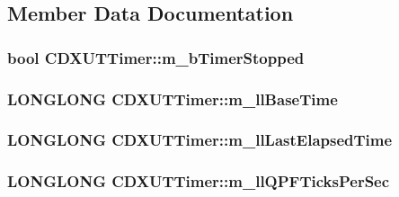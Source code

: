 \subsection{Member Data Documentation}
\hypertarget{class_c_d_x_u_t_timer_ab6969b767724f796674c46618a9cef34}{
\subsubsection[{m\_\-bTimerStopped}]{\setlength{\rightskip}{0pt plus 5cm}bool {\bf CDXUTTimer::m\_\-bTimerStopped}}}
\label{class_c_d_x_u_t_timer_ab6969b767724f796674c46618a9cef34}
\hypertarget{class_c_d_x_u_t_timer_ab756323e5a37b91a5eab6275a27a734a}{
\subsubsection[{m\_\-llBaseTime}]{\setlength{\rightskip}{0pt plus 5cm}LONGLONG {\bf CDXUTTimer::m\_\-llBaseTime}}}
\label{class_c_d_x_u_t_timer_ab756323e5a37b91a5eab6275a27a734a}
\hypertarget{class_c_d_x_u_t_timer_a9dc6f56a2fddb4c275d33ca8858f2367}{
\subsubsection[{m\_\-llLastElapsedTime}]{\setlength{\rightskip}{0pt plus 5cm}LONGLONG {\bf CDXUTTimer::m\_\-llLastElapsedTime}}}
\label{class_c_d_x_u_t_timer_a9dc6f56a2fddb4c275d33ca8858f2367}
\hypertarget{class_c_d_x_u_t_timer_a5d02af56056a52900a24a0b2a4890ebd}{
\subsubsection[{m\_\-llQPFTicksPerSec}]{\setlength{\rightskip}{0pt plus 5cm}LONGLONG {\bf CDXUTTimer::m\_\-llQPFTicksPerSec}}}
